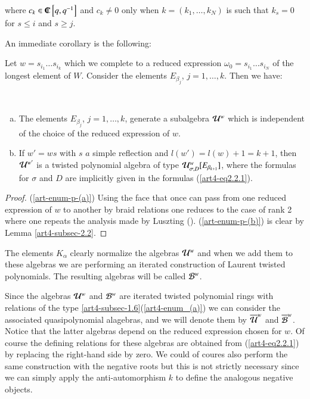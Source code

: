 \noindent
where $c_{k}\in \IC \left[q, q^{-1}\right]$ and $c_{k} \neq 0$ only when $k=(k_{1}, \ldots, k_{N})$ is such that $k_{s} =0 $ for $s\leq i$ and $s\geq j$.

An immediate corollary is the following:

Let $w = s_{i_{1}}\ldots s_{i_{k}}$ which we complete to a reduced expression $\omega_{0} = s_{i_{1}}\ldots s_{i_{N}}$ of the longest element of $W$. Consider the elements $E_{\beta_{j}}$, $j = 1, \ldots, k$. Then we have:

\begin{prop*}
~
\begin{enumerate}[(a)]
\item The elements $E_{\beta_{j}}$, $j=1, \ldots, k$, generate a subalgebra $\mathcal{U}^{w}$ which is independent of the choice of the reduced expression of $w$.\label{art-enum-p-(a)}
\item If $w' = w s$ with $s$ $a$ simple reflection and $l(w') = l(w) +1 = k+1$, then $\mathcal{U}^{w'}$ is a twisted polynomial algebra of type $\mathcal{U}_{\sigma, D}^{w}[E_{\beta_{k+1}}]$, where the formulas for $\sigma$ and $D$ are implicitly given in the formulas (\ref{art4-eq2.2.1}).\label{art-enum-p-(b)}
\end{enumerate}
\end{prop*}

\begin{proof}
(\ref{art-enum-p-(a)}) Using the face that once can pass from one reduced expression of $w$ to another by braid relations one reduces to the case of rank 2 where one repeats the analysis made by Luszting (\cite{art4-keyL}). (\ref{art-enum-p-(b)}) is clear by Lemma \ref{art4-subsec-2.2}. 
\end{proof}

\noindent
The elements $K_{\alpha}$ clearly normalize the algebras $\mathcal{U}^{w}$ and when we add them to these algebras we are performing an iterated construction of Laurent twisted polynomials. The resulting algebras will be called $\mathcal{B}^{w}$.

Since the algebras $\mathcal{U}^{w}$ and $\mathcal{B}^{w}$ are iterated twisted polynomial rings with relations of the type \ref{art4-subsec-1.6}(\ref{art4-enum_(a)}) we can consider the associated quasipolynomial alagebras, and we will denote them by $\overline{\mathcal{U}}^{w}$ and $\overline{\mathcal{B}}^{w}$. Notice that the latter algebras depend on the reduced expression chosen for $w$. Of course the defining relations for these algebras are obtained from (\ref{art4-eq2.2.1}) by replacing the right-hand side by zero. We could of coures also perform the same construction with the negative roots but this is not strictly necessary since we can simply apply the anti-automorphism $k$ to define the analogous negative objects.

